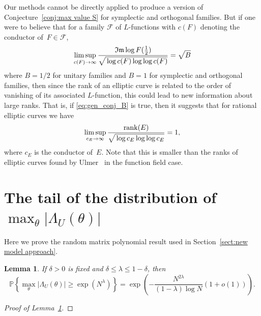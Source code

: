 \documentclass[10pt,reqno,twoside]{amsart}
\renewcommand{\Im}{{\mathfrak{Im}}}
\newcommand{\Prob}{\mathbb{P}}
\DeclareMathOperator{\rank}{rank}
\newtheorem{lemma}[theorem]{Lemma}
\numberwithin{equation}{section}
\numberwithin{theorem}{section}
\begin{document}
{{Our methods cannot be directly applied to produce a version of
Conjecture~\ref{conj:max value S} for symplectic and orthogonal
families. But if one were to believe that for a family $\mathcal
F$ of $L$-functions with $c(F)$ denoting the conductor of~$F\in
\mathcal F$,
\begin{equation}\label{eq:gen_conj_B}
\limsup_{c(F)\to\infty} \frac{\Im \log
F(\tfrac12)}{\sqrt{\mathstrut \log c(F) \log\log c(F) }} =
\sqrt{\mathstrut B }
\end{equation}
where $B=1/2$ for unitary families and $B=1$ for symplectic and
orthogonal families, then since the rank of an elliptic curve is
related to the order of vanishing of its associated $L$-function,
this could lead to new information about large ranks. That is, if
\eqref{eq:gen_conj_B} is true, then it suggests that for rational
elliptic curves we have
\begin{equation}
\limsup_{c_E \to \infty} \frac{\rank(E)}{\sqrt{\mathstrut \log c_E
\log\log c_E}} = 1 ,
\end{equation}
where $c_E$ is the conductor of~$E$.
Note that this is smaller than the ranks of elliptic curves found
by Ulmer~\cite{Ul} in the function field case.





\appendix
\section{The tail of the distribution of $\max_\theta |\Lambda_U(\theta)|$}
\label{sect:proofs}

Here we prove  the  random matrix polynomial result used in
Section~\ref{sect:new model approach}.


\begin{lemma}\label{lemma:maxthetadist}
If $\delta>0$ is fixed and $\delta\le \lambda \le 1-\delta $,
then
\begin{equation}\label{eqn:lambdatail}
\Prob\left\{ \max_\theta |\Lambda_{U}(\theta)| \geq
\exp(N^\lambda) \right\} = \exp\left(-\frac{N^{2\lambda}}{
(1-\lambda) \log N} (1+o(1))\right) .
\end{equation}
\end{lemma}

\begin{proof}[Proof of Lemma~\ref{lemma:maxthetadist}]


\end{proof}}}
\end{document}
